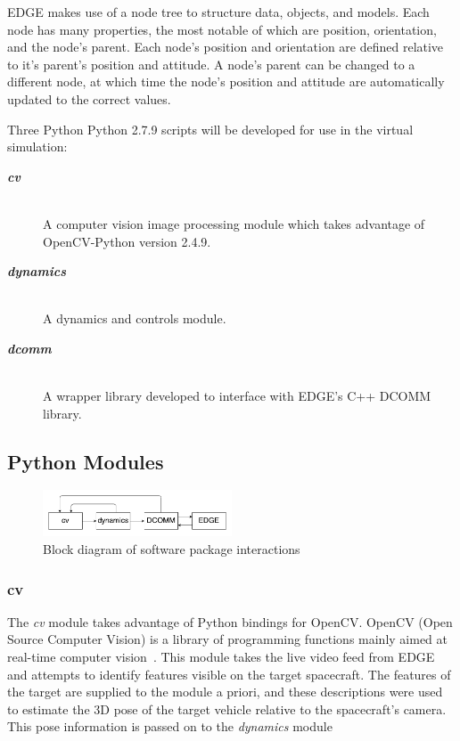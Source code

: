 \documentclass[journal, 10pt]{IEEEtran}
\begin{document}
EDGE makes use of a node tree to structure data, objects, and models. Each node has many properties, the most notable of which are position, orientation, and the node's parent. Each node's position and orientation are defined relative to it's parent's position and attitude. A node's parent can be changed to a different node, at which time the node's position and attitude are automatically updated to the correct values.

Three Python Python 2.7.9 scripts will be developed for use in the virtual simulation:
\begin{description}
    \item[\textbf{\textit{cv}}] \hfill \\
    A computer vision image processing module which takes advantage of OpenCV-Python version 2.4.9.
    \item[\textbf{\textit{dynamics}}] \hfill \\
    A dynamics and controls module.
    \item[\textbf{\textit{dcomm}}] \hfill \\
    A wrapper library developed to interface with EDGE's C++ DCOMM library.
\end{description}

\subsection{Python Modules}
\begin{figure}[b]
\begin{center}
\includegraphics[width=0.5\textwidth]{figures/block.pdf}
\caption{Block diagram of software package interactions}
\label{block_diagram}
\end{center}
\end{figure}

\subsubsection{cv}
The \textit{cv} module takes advantage of Python bindings for OpenCV. OpenCV (Open Source Computer Vision) is a library of programming functions mainly aimed at real-time computer vision~\cite{opencv}. This module takes the live video feed from EDGE and attempts to identify features visible on the target spacecraft. The features of the target are supplied to the module a priori, and these descriptions were used to estimate the 3D pose of the target vehicle relative to the spacecraft's camera. This pose information is passed on to the \textit{dynamics} module
\end{document}
